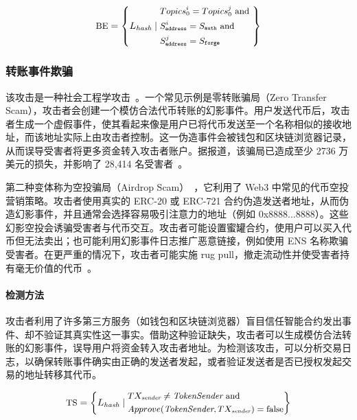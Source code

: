 \begin{equation}
\small
\text{BE} = \left\{
L_{\textit{hash}} \mid
\begin{aligned}
  & Topics_0^i = Topics_0^j \text{ and } \\
  & S_{\texttt{address}}^i = S_{\texttt{auth}} \text{ and } \\
  & S_{\texttt{address}}^j = S_{\texttt{forge}}
\end{aligned}
\right\}
\end{equation}



\subsubsection{转账事件欺骗}\label{vec:attack4}

该攻击是一种社会工程学攻击~\cite{social_engineer}。一个常见示例是零转账骗局（Zero Transfer Scam），攻击者会创建一个模仿合法代币转账的幻影事件。用户发送代币后，攻击者生成一个虚假事件，使其看起来像是用户已将代币发送至一个名称相似的接收地址，而该地址实际上由攻击者控制。这一伪造事件会被钱包和区块链浏览器记录，从而误导受害者将更多资金转入攻击者账户。据报道，该骗局已造成至少 2736 万美元的损失，并影响了 28,414 名受害者~\cite{wallet_visual}。

第二种变体称为空投骗局（Airdrop Scam）~\cite{spoof}，它利用了 Web3 中常见的代币空投营销策略。攻击者使用真实的 ERC-20 或 ERC-721 合约伪造发送者地址，从而伪造幻影事件，并且通常会选择容易吸引注意力的地址（例如 0x8888...8888）。这些幻影空投会诱骗受害者与代币交互。攻击者可能设置蜜罐合约，使用户可以买入代币但无法卖出；也可能利用幻影事件日志推广恶意链接，例如使用 ENS 名称欺骗受害者。在更严重的情况下，攻击者可能实施 rug pull，撤走流动性并使受害者持有毫无价值的代币~\cite{rugpull}。


\paragraph{检测方法}
攻击者利用了许多第三方服务（如钱包和区块链浏览器）盲目信任智能合约发出事件、却不验证其真实性这一事实。借助这种验证缺失，攻击者可以生成模仿合法转账的幻影事件，误导用户将资金转入攻击者地址。为检测该攻击，可以分析交易日志，以确保转账事件确实由正确的发送者发起，或者验证发送者是否已授权发起交易的地址转移其代币。


\begin{equation}
\small
\text{TS} = \left\{
L_{\textit{hash}} \mid
\begin{aligned}
  & TX_{\textit{sender}} \neq \textit{TokenSender} \text{ and } \\
  & Approve(\textit{TokenSender}, TX_{\textit{sender}}) = \text{false}
\end{aligned}
\right\}
\end{equation}


